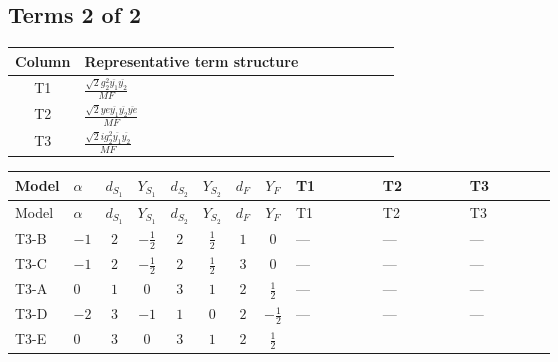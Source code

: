 \documentclass[8pt]{article}
\begin{document}
\begin{landscape}
\subsection*{Terms 2 of 2}
\begin{center}
\begin{tabular}{@{}c >{\raggedright\arraybackslash}p{0.82\linewidth}@{}}
\toprule
Column & Representative term structure \\
\midrule
T1 & \(\displaystyle \frac{\sqrt{2} g_{2}^{2} \overline{y_{1}} \overline{y_{2}}}{MF}\) \\
\midrule
T2 & \(\displaystyle \frac{\sqrt{2} ye \overline{y_{1}} \overline{y_{2}} \overline{ye}}{MF}\) \\
\midrule
T3 & \(\displaystyle \frac{\sqrt{2} i g_{2}^{2} \overline{y_{1}} \overline{y_{2}}}{MF}\) \\
\midrule
\bottomrule
\end{tabular}
\end{center}
\smallskip
\tiny
\begin{longtable}{@{}llcccccc >{\raggedright\arraybackslash}p{0.21\linewidth} >{\raggedright\arraybackslash}p{0.21\linewidth} >{\raggedright\arraybackslash}p{0.21\linewidth}@{}}
\toprule
Model & $\alpha$ & $d_{S_1}$ & $Y_{S_1}$ & $d_{S_2}$ & $Y_{S_2}$ & $d_F$ & $Y_F$ & T1 & T2 & T3 \\
\midrule
\endfirsthead
\toprule
Model & $\alpha$ & $d_{S_1}$ & $Y_{S_1}$ & $d_{S_2}$ & $Y_{S_2}$ & $d_F$ & $Y_F$ & T1 & T2 & T3 \\
\midrule
\endhead
T3-B & $-1$ & $2$ & $-\frac{1}{2}$ & $2$ & $\frac{1}{2}$ & $1$ & $0$ & --- & --- & --- \\
\midrule
T3-C & $-1$ & $2$ & $-\frac{1}{2}$ & $2$ & $\frac{1}{2}$ & $3$ & $0$ & --- & --- & --- \\
\midrule
T3-A & $0$ & $1$ & $0$ & $3$ & $1$ & $2$ & $\frac{1}{2}$ & --- & --- & --- \\
\midrule
T3-D & $-2$ & $3$ & $-1$ & $1$ & $0$ & $2$ & $-\frac{1}{2}$ & --- & --- & --- \\
\midrule
T3-E & $0$ & $3$ & $0$ & $3$ & $1$ & $2$ & $\frac{1}{2}$ & \scriptsize\adjustbox{max width=\linewidth}{$\begin{gathered} \frac{33 \sqrt{2} g_{2}^{2} \overline{y_{1}} \overline{y_{2}}}{16 MF}\end{gathered}$} & \scriptsize\adjustbox{max width=\linewidth}{$\begin{gathered} - \frac{\sqrt{2} ye \overline{y_{1}} \overline{y_{2}} \overline{ye}}{8 MF}\end{gathered}$} & \scriptsize\adjustbox{max width=\linewidth}{$\begin{gathered} \frac{\sqrt{2} i g_{2}^{2} \overline{y_{1}} \overline{y_{2}}}{4 MF}\end{gathered}$} \\
\midrule
\bottomrule
\end{longtable}
\clearpage

\end{landscape}
\end{document}

